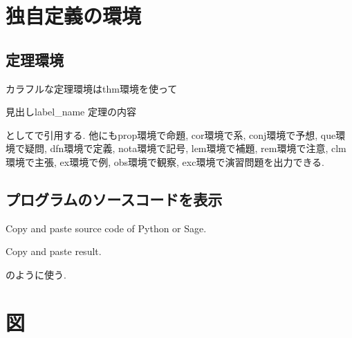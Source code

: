 \documentclass[11pt,a4paper,oneside,lualatex]{ltjsarticle} %
\begin{document}
\section{独自定義の環境} \label{sec:environment}



\subsection{定理環境} \label{subsec:thm}



カラフルな定理環境はthm環境を使って
\begin{thm}{見出し}{label_name}
	定理の内容
\end{thm}
としてで引用する.
他にもprop環境で命題, cor環境で系, conj環境で予想, que環境で疑問, dfn環境で定義, nota環境で記号, lem環境で補題, rem環境で注意, clm環境で主張, ex環境で例, obs環境で観察, exc環境で演習問題を出力できる.


\subsection{プログラムのソースコードを表示} \label{subsec:program}


\begin{Python}
Copy and paste source code of Python or Sage.
\end{Python}
\begin{result}
Copy and paste result.
\end{result}
のように使う.


\section{図} \label{sec:diag}
\end{document}
